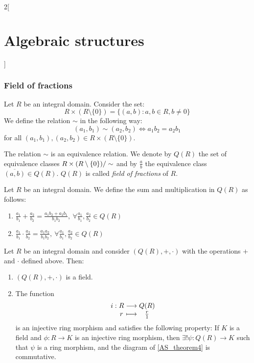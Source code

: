 \documentclass[../../../main_math.tex]{subfiles}
\begin{document}
\begin{multicols}{2}[\section{Algebraic structures}]
  \subsubsection{Field of fractions}
  \begin{definition}\label{AS_field-frac}
    Let $R$ be an integral domain. Consider the set: $$R\times(R\setminus\{0\})=\{(a,b):a,b\in R,b\ne 0\}$$ We define the relation $\sim$ in the following way: $$(a_1,b_1)\sim(a_2,b_2)\iff a_1b_2=a_2b_1$$ for all $(a_1,b_1),(a_2,b_2)\in R\times(R\setminus\{0\})$.
  \end{definition}
  \begin{lemma}
    The relation $\sim$ is an equivalence relation. We denote by $Q(R)$ the set of equivalence classes $\quot{R\times(R\setminus\{0\})}{\sim}$ and by $\frac{a}{b}$ the equivalence class $\overline{(a,b)}\in Q(R)$. $Q(R)$ is called \emph{field of fractions} of $R$.
  \end{lemma}
  \begin{definition}
    Let $R$ be an integral domain. We define the sum and multiplication in $Q(R)$ as follows:
    \begin{enumerate}
      \item $\displaystyle\frac{a_1}{b_1}+\frac{a_2}{b_2}=\frac{a_1b_2+a_2b_1}{b_1b_2},\ \forall\frac{a_1}{b_1},\frac{a_2}{b_2}\in Q(R)$
      \item $\displaystyle\frac{a_1}{b_1}\cdot\frac{a_2}{b_2}=\frac{a_1a_2}{b_1b_2},\ \forall\frac{a_1}{b_1},\frac{a_2}{b_2}\in Q(R)$
    \end{enumerate}
  \end{definition}
  \begin{theorem}
    Let $R$ be an integral domain and consider $(Q(R),+,\cdot)$ with the operations $+$ and $\cdot$ defined above. Then:
    \begin{enumerate}
      \item $(Q(R),+,\cdot)$ is a field.
      \item The function
            $$\function{i}{R}{Q(R)}{r}{\frac{r}{1}}$$
            is an injective ring morphism and satisfies the following property: If $K$ is a field and $\phi:R\rightarrow K$ is an injective ring morphism, then $\exists!\psi:Q(R)\rightarrow K$ such that $\psi$ is a ring morphism, and the diagram of \cref{AS_theorem4} is commutative.
    \end{enumerate}
    \begin{center}
      \begin{minipage}{\linewidth}
        \centering
        
        \label{AS_theorem4}
      \end{minipage}
    \end{center}
  \end{theorem}

\end{multicols}
\end{document}
